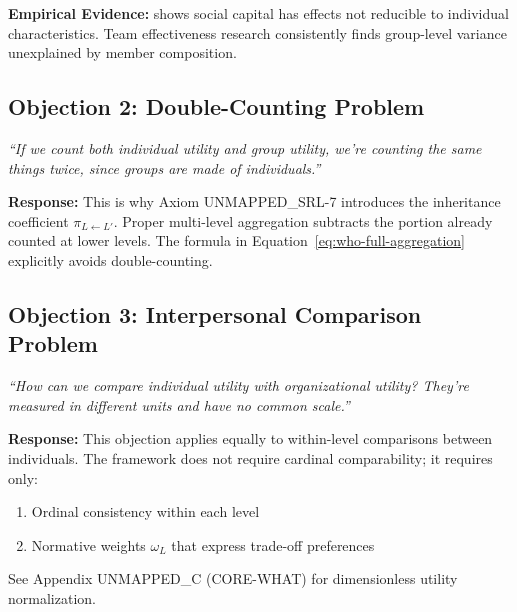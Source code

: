 \textbf{Empirical Evidence:}
\citet{putnam2000bowling} shows social capital has effects not reducible
to individual characteristics. Team effectiveness research consistently
finds group-level variance unexplained by member composition.

\subsection{Objection 2: Double-Counting Problem}

\begin{tcolorbox}[colback=red!5!white, colframe=red!50!black,
    title=Objection: Multi-Level Aggregation Double-Counts]
\textit{``If we count both individual utility and group utility, we're counting
the same things twice, since groups are made of individuals.''}
\end{tcolorbox}

\textbf{Response:}
This is why Axiom UNMAPPED_SRL-7 introduces the inheritance coefficient $\pi_{L \leftarrow L'}$.
Proper multi-level aggregation subtracts the portion already counted at lower levels.
The formula in Equation~\ref{eq:who-full-aggregation} explicitly avoids double-counting.

\subsection{Objection 3: Interpersonal Comparison Problem}

\begin{tcolorbox}[colback=red!5!white, colframe=red!50!black,
    title=Objection: Cross-Level Comparison is Meaningless]
\textit{``How can we compare individual utility with organizational utility?
They're measured in different units and have no common scale.''}
\end{tcolorbox}

\textbf{Response:}
This objection applies equally to within-level comparisons between individuals.
The framework does not require cardinal comparability; it requires only:
\begin{enumerate}
\item Ordinal consistency within each level
\item Normative weights $\omega_L$ that express trade-off preferences
\end{enumerate}

See Appendix UNMAPPED_C (CORE-WHAT) for dimensionless utility normalization.


